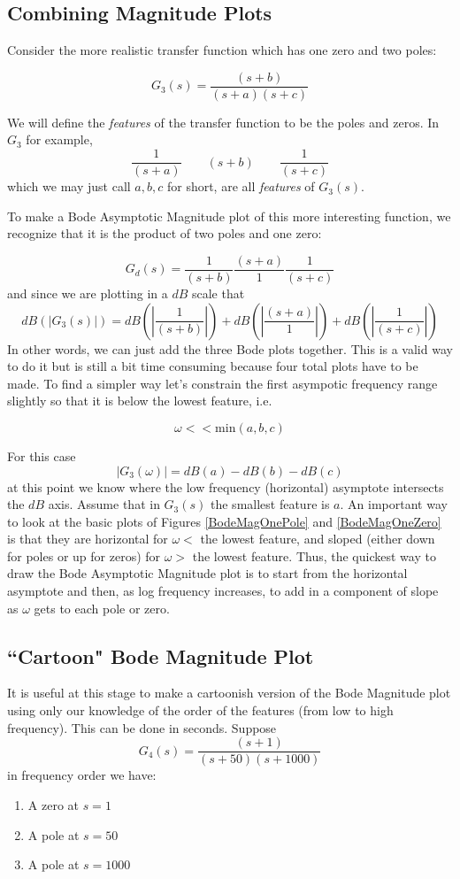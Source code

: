 \subsection{Combining Magnitude Plots}

Consider the more realistic transfer function which has one zero and two poles:

\[
G_3(s) = \frac    {(s+b)} {(s+a)(s+c)}
\]

We will define the {\it features} of the transfer function to be the  poles and zeros.
In $G_3$ for example,
\[
\frac {1} {(s+a)} \qquad {(s+b)} \qquad\frac {1} {(s+c)}
\]
which we may just call $a,b,c$ for short, are all {\it features} of $G_3(s)$.

To make a Bode Asymptotic Magnitude plot of this more interesting function, we recognize that it is the product of two poles and one zero:

\[
G_d(s) = \frac {1} {(s+b)}  \frac {(s+a)} {1}  \frac {1} {(s+c)}
\]
and since we are plotting in a $dB$ scale that
\[
dB(|G_3(s)|) =  dB(\left |\frac {1} {(s+b)}\right |) +   dB(\left |\frac {(s+a)} {1}\right | ) +  dB( \left | \frac {1} {(s+c)}\right |  )
\]
In other words, we can just add the three Bode plots together.   This is a valid way to do it but is still a bit time consuming because four total plots have to be made.   To find a simpler way let's constrain the first asympotic frequency range slightly so that it is below the lowest feature, i.e.

\[
\omega <<  \mathrm{min}(a,b,c)
\]

For this case
\[
|G_3(\omega)| = dB(a) - dB(b)  - dB(c)
\]
at this point we know where the low frequency (horizontal) asymptote intersects the $dB$ axis.
Assume that in $G_3(s)$ the smallest feature is $a$.
An important way to look at the basic plots of Figures \ref{BodeMagOnePole} and \ref{BodeMagOneZero} is that they are horizontal for $\omega < $ the lowest feature, and sloped (either down for poles or up for zeros) for $\omega > $ the lowest feature.
Thus, the quickest way to draw the Bode Asymptotic Magnitude plot is to start from the horizontal asymptote and then,
as log frequency increases, to add in a component of slope as $\omega$ gets to each pole or zero.


\subsection{``Cartoon" Bode Magnitude Plot}
It is useful at this stage to make a cartoonish version of the Bode Magnitude plot using only
our knowledge of the order of the features (from low to high frequency). This can be done in
seconds.  Suppose
\[
G_4(s) = \frac  {(s+1)}  {(s+50)(s+1000)}
\]
in frequency order we have:
\begin{enumerate}
  \item A zero at $s=1$
  \item A pole at $s=50$
  \item A pole at $s=1000$
\end{enumerate}

